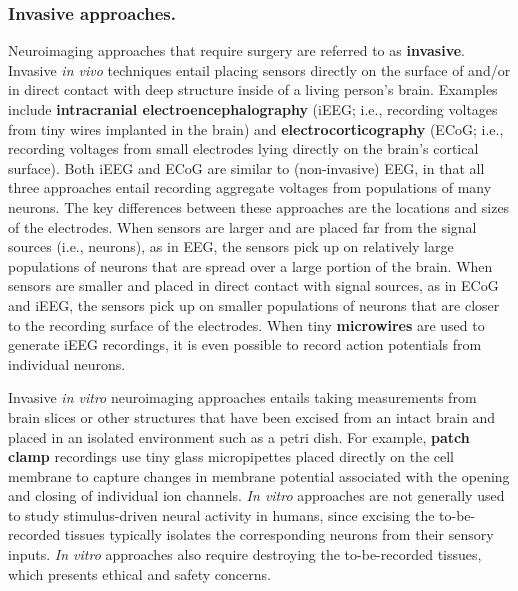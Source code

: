 \documentclass[runningheads]{llncs}
\begin{document}
\subsubsection{Invasive approaches.}
Neuroimaging approaches that require surgery are referred to as
\textbf{invasive}.  Invasive \textit{in vivo} techniques entail
placing sensors directly on the surface of and/or in direct contact
with deep structure inside of a living person's brain.  Examples
include \textbf{intracranial electroencephalography} (iEEG; i.e.,
recording voltages from tiny wires implanted in the brain) and
\textbf{electrocorticography} (ECoG; i.e., recording voltages from
small electrodes lying directly on the brain's cortical surface).
Both iEEG and ECoG are similar to (non-invasive) EEG, in that all
three approaches entail recording aggregate voltages from populations
of many neurons.  The key differences between these approaches are the
locations and sizes of the electrodes.  When sensors are larger and
are placed far from the signal sources (i.e., neurons), as in EEG, the
sensors pick up on relatively large populations of neurons that are
spread over a large portion of the brain.  When sensors are smaller
and placed in direct contact with signal sources, as in ECoG and iEEG,
the sensors pick up on smaller populations of neurons that are closer
to the recording surface of the electrodes.  When tiny
\textbf{microwires} are used to generate iEEG recordings, it is even
possible to record action potentials from individual neurons.

Invasive \textit{in vitro} neuroimaging approaches entails taking
measurements from brain slices or other structures that have been
excised from an intact brain and placed in an isolated environment
such as a petri dish.  For example, \textbf{patch clamp} recordings
use tiny glass micropipettes placed directly on the cell membrane to
capture changes in membrane potential associated with the opening and
closing of individual ion channels.  \textit{In vitro} approaches are
not generally used to study stimulus-driven neural activity in humans,
since excising the to-be-recorded tissues typically isolates the
corresponding neurons from their sensory inputs.  \textit{In vitro}
approaches also require destroying the to-be-recorded tissues, which
presents ethical and safety concerns.
\end{document}
